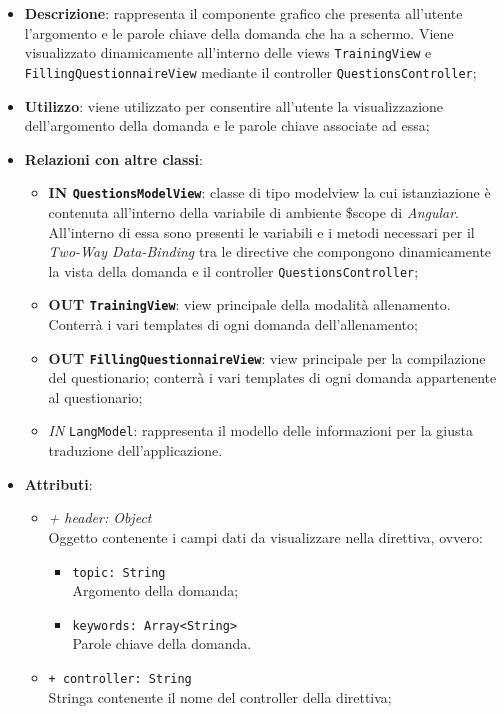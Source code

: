 		\begin{itemize}
			\item \textbf{Descrizione}: rappresenta il componente grafico che presenta all'utente l'argomento e le parole chiave della domanda che ha a schermo. Viene visualizzato dinamicamente all'interno delle views \texttt{TrainingView} e \texttt{FillingQuestionnaireView} mediante il controller \texttt{QuestionsController};
			\item \textbf{Utilizzo}: viene utilizzato per consentire all'utente la visualizzazione dell'argomento della domanda e le parole chiave associate ad essa;
			\item \textbf{Relazioni con altre classi}: 
			\begin{itemize}
				\item \textbf{IN \texttt{QuestionsModelView}}: classe di tipo modelview la cui istanziazione è contenuta all'interno della variabile di ambiente \$scope di \textit{Angular}. All'interno di essa sono presenti le variabili e i metodi necessari per il \textit{Two-Way Data-Binding} tra le directive che compongono dinamicamente la vista della domanda e il controller \texttt{QuestionsController};
				\item \textbf{OUT \texttt{TrainingView}}: view principale della modalità allenamento. Conterrà i vari templates di ogni domanda dell'allenamento;
				\item \textbf{OUT \texttt{FillingQuestionnaireView}}: view principale per la compilazione del questionario; conterrà i vari templates di ogni domanda appartenente al questionario;   
				\item \textit{IN} \texttt{LangModel}: rappresenta il modello delle informazioni per la giusta traduzione dell'applicazione.
			\end{itemize}
			\item \textbf{Attributi}:
			\begin{itemize}
				\item \textit{+ header: Object} \\ Oggetto contenente i campi dati da visualizzare nella direttiva, ovvero:
				\begin{itemize}
					\item \texttt{topic: String} \\ Argomento della domanda;
					\item \texttt{keywords: Array<String>} \\ Parole chiave della domanda.
				\end{itemize}
				\item \texttt{+ controller: String} \\ Stringa contenente il nome del controller della direttiva;

\end{itemize}
\end{itemize}
